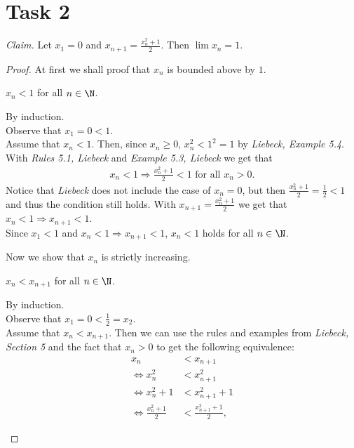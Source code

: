 \documentclass{article}
\begin{document}
\section*{Task 2}
\emph{Claim.} Let $x_1=0$ and $x_{n+1}=\frac{x_n^2+1}{2}$. Then $\lim x_n=1$.
\begin{proof}
At first we shall proof that $x_n$ is bounded above by $1$.
\begin{adjustwidth}{2em}{0pt}
  \begin{claim}
    $x_n<1$ for all $n\in\N$.
  \end{claim}
  \begin{claimproof}
    By induction.\\
    Observe that $x_1=0<1$.\\
    Assume that $x_n<1$. Then, since $x_n\geq 0$, $x_n^2<1^2=1$ by \emph{Liebeck, Example 5.4}. With \emph{Rules 5.1, Liebeck} and \emph{Example 5.3, Liebeck} we get that
    \begin{align*}
      x_n<1 \Rightarrow \frac{x_n^2+1}{2}<1 \text{ for all } x_n > 0.
    \end{align*}
    Notice that \emph{Liebeck} does not include the case of $x_n=0$, but then $\frac{x_n^2+1}{2}=\frac{1}{2}<1$ and thus the condition still holds.
    With $x_{n+1}=\frac{x^2_n+1}{2}$ we get that $x_n<1\Rightarrow x_{n+1}<1$.\\
    Since $x_1<1$ and $x_n<1 \Rightarrow x_{n+1}<1$, $x_n<1$ holds for all $n\in\N$.
  \end{claimproof}
\end{adjustwidth}
Now we show that $x_n$ is strictly increasing.
\begin{adjustwidth}{2em}{0pt}
  \begin{claim}
    $x_n<x_{n+1}$ for all $n\in\N$.
  \end{claim} 
  \begin{claimproof}
    By induction.\\
    Observe that $x_1=0<\frac{1}{2}=x_2$.\\
    Assume that $x_n<x_{n+1}$. Then we can use the rules and examples from \emph{Liebeck, Section 5} and the fact that $x_n>0$ to get the following equivalence:
    \begin{align*}
      x_n&<x_{n+1}\\
      \Leftrightarrow x_n^2&<x_{n+1}^2\\
      \Leftrightarrow x_n^2+1&<x_{n+1}^2+1\\
      \Leftrightarrow \frac{x_n^2+1}{2}&<\frac{x_{n+1}^2+1}{2},
    \end{align*}

\end{claimproof}
\end{adjustwidth}
\end{proof}
\end{document}
